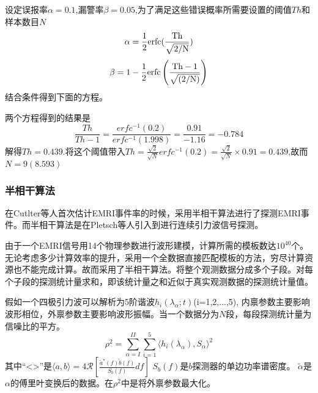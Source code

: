 设定误报率$\alpha=0.1$,漏警率$\beta=0.05$,为了满足这些错误概率所需要设置的阈值$Th$和样本数目$N$
\begin{equation}
\alpha = \frac{1}{2} \rm erfc(\frac{\rm Th}{\sqrt{2/N}})
\end{equation}
\begin{equation}
\beta = 1-\frac{1}{2} \rm erfc \left (  \frac{\rm Th-1}{\sqrt{(2/N)}} \right )
\end{equation}
结合条件得到下面的方程。
\begin{comment}
\begin{equation}
Th = \frac{\sqrt{2}}{\sqrt{N}} \erfc^{-1}(2\alpha)=\frac{\sqrt{2}}{\sqrt{N}} \erfc^{-1}(0.2)
\end{equation}

\begin{equation}
\rm Th-1 = \frac{\sqrt{2}}{\sqrt{N}} \erfc^{-1}[2(1-\beta)]=\frac{\sqrt{2}}{\sqrt{N}} \erfc^{-1}(1.998)
\end{equation}
\end{comment}
两个方程得到的结果是
\begin{equation}
\frac{Th}{Th-1}=\frac{erfc^{-1}(0.2)}{erfc^{-1}(1.998)} =\frac{0.91}{-1.16} =-0.784
\end{equation}
解得$Th=0.439$.将这个阈值带入$Th=\frac{\sqrt{2}}{\sqrt{N}} erfc^{-1}(0.2)=\frac{\sqrt{2}}{\sqrt{N}} \times 0.91 =0.439$,故而$N=9(8.593)$





\subsubsection*{半相干算法}
在Cutlter等人首次估计EMRI事件率的时候，采用半相干算法进行了探测EMRI事件。而半相干算法是在Pletsch等人\cite{pletsch2010parameter}引入到进行连续引力波信号探测。

由于一个EMRI信号用14个物理参数进行波形建模，计算所需的模板数达$10^{40}$个。无论考虑多少计算效率的提升，采用一个全数据直接匹配模板的方法，穷尽计算资源也不能完成计算。故而采用了半相干算法。将整个观测数据分成多个子段。对每个子段的探测统计量求和，即该统计量之和近似于真实观测数据的探测统计量值。

假如一个四极引力波可以解析为5阶谐波$h_i(\lambda_\alpha;t)$(i=1,2,...,5), 内禀参数主要影响波形相位，外禀参数主要影响波形振幅。当一个数据分为$N$段，每段探测统计量为信噪比的平方。
\begin{equation}
\rho^2 = \sum_{\alpha=I}^{II} \sum_{i=1}^{5} \langle h_i(\lambda_\alpha),S_\alpha \rangle^2
\end{equation}
其中``<>''是$\langle a,b \rangle = 4\mathcal{R} \left [\frac{\tilde{a}^{\star}(f)\tilde{b}(f)}{S_b(f)} df  \right ]$
$S_b(f)$是$b$探测器的单边功率谱密度。 $\tilde{\alpha}$是$\alpha$的傅里叶变换后的数据。在$\rho^2$中是将外禀参数最大化。

